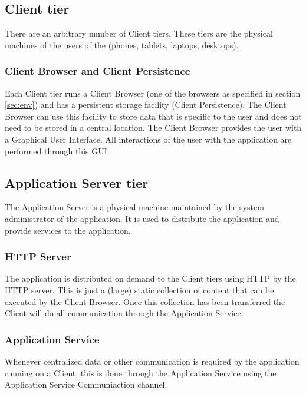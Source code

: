 \subsection{Client tier}
\label{sec:clienttier}
There are an arbitrary number of Client tiers. These tiers are the physical machines of the users of the \applicationname{} (phones, tablets, laptops, desktops).

\subsubsection{Client Browser and Client Persistence}
\label{sec:clientbrowser} 
Each Client tier runs a Client Browser (one of the browsers as specified in section \ref{sec:env}) and has a persistent storage facility (Client Persistence). The Client Browser can use this facility to store data that is specific to the user and does not need to be stored in a central location. The Client Browser provides the user with a Graphical User Interface. All interactions of the user with the application are performed through this GUI.

\subsection{Application Server tier}
\label{sec:aplicationserver}
The Application Server is a physical machine maintained by the system administrator of the application. It is used to distribute the application and provide services to the application.

\subsubsection{HTTP Server}
\label{sec:httpserver}
The application is distributed on demand to the Client tiers using HTTP by the HTTP server. This is just a (large) static collection of content that can be executed by the Client Browser. Once this collection has been transferred the Client will do all communication through the Application Service.

\subsubsection{Application Service}
\label{sec:applicationservice}
Whenever centralized data or other communication is required by the application running on a Client, this is done through the Application Service using the Application Service Communiaction channel.

